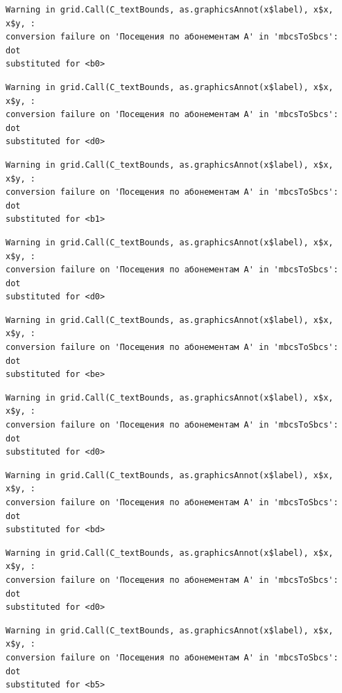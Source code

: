 \documentclass[
  letterpaper,
  DIV=11,
  numbers=noendperiod]{scrartcl}
\begin{document}
\begin{verbatim}
Warning in grid.Call(C_textBounds, as.graphicsAnnot(x$label), x$x, x$y, :
conversion failure on 'Посещения по абонементам А' in 'mbcsToSbcs': dot
substituted for <b0>
\end{verbatim}

\begin{verbatim}
Warning in grid.Call(C_textBounds, as.graphicsAnnot(x$label), x$x, x$y, :
conversion failure on 'Посещения по абонементам А' in 'mbcsToSbcs': dot
substituted for <d0>
\end{verbatim}

\begin{verbatim}
Warning in grid.Call(C_textBounds, as.graphicsAnnot(x$label), x$x, x$y, :
conversion failure on 'Посещения по абонементам А' in 'mbcsToSbcs': dot
substituted for <b1>
\end{verbatim}

\begin{verbatim}
Warning in grid.Call(C_textBounds, as.graphicsAnnot(x$label), x$x, x$y, :
conversion failure on 'Посещения по абонементам А' in 'mbcsToSbcs': dot
substituted for <d0>
\end{verbatim}

\begin{verbatim}
Warning in grid.Call(C_textBounds, as.graphicsAnnot(x$label), x$x, x$y, :
conversion failure on 'Посещения по абонементам А' in 'mbcsToSbcs': dot
substituted for <be>
\end{verbatim}

\begin{verbatim}
Warning in grid.Call(C_textBounds, as.graphicsAnnot(x$label), x$x, x$y, :
conversion failure on 'Посещения по абонементам А' in 'mbcsToSbcs': dot
substituted for <d0>
\end{verbatim}

\begin{verbatim}
Warning in grid.Call(C_textBounds, as.graphicsAnnot(x$label), x$x, x$y, :
conversion failure on 'Посещения по абонементам А' in 'mbcsToSbcs': dot
substituted for <bd>
\end{verbatim}

\begin{verbatim}
Warning in grid.Call(C_textBounds, as.graphicsAnnot(x$label), x$x, x$y, :
conversion failure on 'Посещения по абонементам А' in 'mbcsToSbcs': dot
substituted for <d0>
\end{verbatim}

\begin{verbatim}
Warning in grid.Call(C_textBounds, as.graphicsAnnot(x$label), x$x, x$y, :
conversion failure on 'Посещения по абонементам А' in 'mbcsToSbcs': dot
substituted for <b5>
\end{verbatim}
\end{document}
